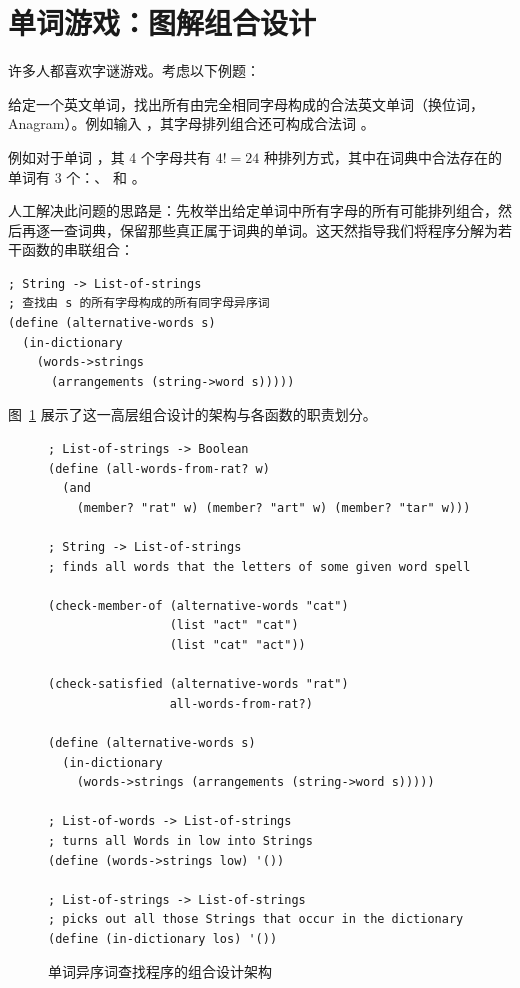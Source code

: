 \section{单词游戏：图解组合设计}
\label{sec:ch12_word_games_composition}

许多人都喜欢字谜游戏。考虑以下例题：
\begin{notebox}[字谜求解]
给定一个英文单词，找出所有由完全相同字母构成的合法英文单词（换位词，Anagram）。例如输入 ，其字母排列组合还可构成合法词 。
\end{notebox}

例如对于单词 ，其 4 个字母共有 $4! = 24$ 种排列方式，其中在词典中合法存在的单词有 3 个：、 和 。

人工解决此问题的思路是：先枚举出给定单词中所有字母的所有可能排列组合，然后再逐一查词典，保留那些真正属于词典的单词。这天然指导我们将程序分解为若干函数的串联组合：
\begin{lstlisting}[language=BSL]
; String -> List-of-strings
; 查找由 s 的所有字母构成的所有同字母异序词
(define (alternative-words s)
  (in-dictionary
    (words->strings
      (arrangements (string->word s)))))
\end{lstlisting}

图~\ref{fig:finding_alternative_words} 展示了这一高层组合设计的架构与各函数的职责划分。

\begin{figure}[htbp]
  \centering
\begin{lstlisting}[language=BSL, basicstyle=\scriptsize\ttfamily]
; List-of-strings -> Boolean
(define (all-words-from-rat? w)
  (and
    (member? "rat" w) (member? "art" w) (member? "tar" w)))

; String -> List-of-strings
; finds all words that the letters of some given word spell

(check-member-of (alternative-words "cat")
                 (list "act" "cat")
                 (list "cat" "act"))

(check-satisfied (alternative-words "rat")
                 all-words-from-rat?)

(define (alternative-words s)
  (in-dictionary
    (words->strings (arrangements (string->word s)))))

; List-of-words -> List-of-strings
; turns all Words in low into Strings
(define (words->strings low) '())

; List-of-strings -> List-of-strings
; picks out all those Strings that occur in the dictionary
(define (in-dictionary los) '())
\end{lstlisting}
  \caption{单词异序词查找程序的组合设计架构}
  \label{fig:finding_alternative_words}
\end{figure}


